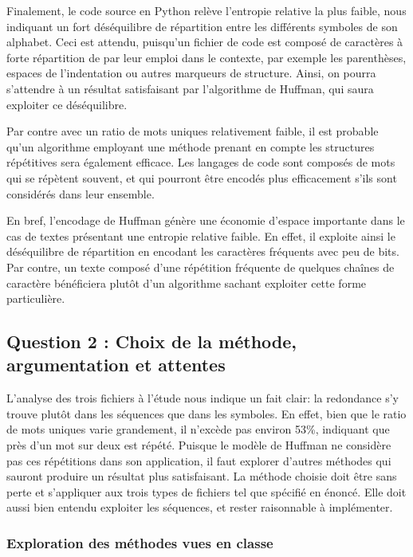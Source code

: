 \documentclass[12pt,letterpaper]{article}
\begin{document}
Finalement, le code source en Python relève l'entropie relative la plus faible, nous indiquant un fort déséquilibre de répartition entre les différents symboles de son alphabet.
Ceci est attendu, puisqu'un fichier de code est composé de caractères à forte répartition de par leur emploi dans le contexte, par exemple les parenthèses, espaces de l'indentation ou autres marqueurs de structure.
Ainsi, on pourra s'attendre à un résultat satisfaisant par l'algorithme de Huffman, qui saura exploiter ce déséquilibre.

Par contre avec un ratio de mots uniques relativement faible, il est probable qu'un algorithme employant une méthode prenant en compte les structures répétitives sera également efficace.
Les langages de code sont composés de mots qui se répètent souvent, et qui pourront être encodés plus efficacement s'ils sont considérés dans leur ensemble.

En bref, l'encodage de Huffman génère une économie d'espace importante dans le cas de textes présentant une entropie relative faible. 
En effet, il exploite ainsi le déséquilibre de répartition en encodant les caractères fréquents avec peu de bits.
Par contre, un texte composé d'une répétition fréquente de quelques chaînes de caractère bénéficiera plutôt d'un algorithme sachant exploiter cette forme particulière.


\subsection{Question 2 : Choix de la méthode, argumentation et attentes}
\label{subsec:q2}

L'analyse des trois fichiers à l'étude nous indique un fait clair: la redondance s'y trouve plutôt dans les séquences que dans les symboles.
En effet, bien que le ratio de mots uniques varie grandement, il n'excède pas environ 53\%, indiquant que près d'un mot sur deux est répété.
Puisque le modèle de Huffman ne considère pas ces répétitions dans son application, il faut explorer d'autres méthodes qui sauront produire un résultat plus satisfaisant.
La méthode choisie doit être sans perte et s'appliquer aux trois types de fichiers tel que spécifié en énoncé.
Elle doit aussi bien entendu exploiter les séquences, et rester raisonnable à implémenter.

\subsubsection*{Exploration des méthodes vues en classe}
\end{document}
